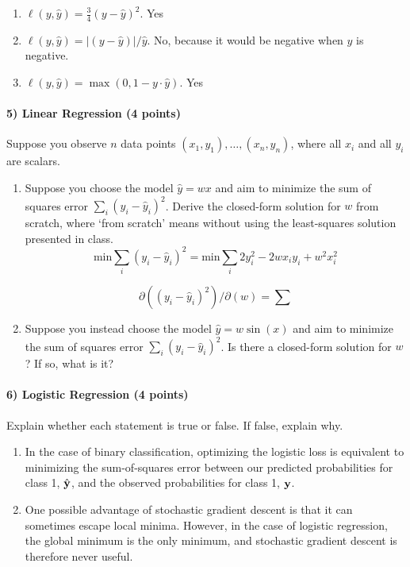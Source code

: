 \documentclass[11pt]{article}
\newcommand{\vy}{{\bf y}}
\begin{document}
	\begin{enumerate}
		\item $\ell (y, \hat{y}) = \frac{3}{4} (y-\hat{y})^2$. Yes
		\item $\ell (y, \hat{y}) = |(y-\hat{y})|/\hat{y}$. No, because it would be negative when $\hat{y}$ is negative.
		\item $\ell (y, \hat{y}) = \max(0, 1 - y \cdot \hat{y})$. Yes
	\end{enumerate}
	
	\paragraph{5) Linear Regression (4 points)} Suppose you observe $n$ data points $(x_1, y_1), \ldots, (x_n, y_n)$, where all $x_i$ and all $y_i$ are scalars.
	\begin{enumerate}
		\item Suppose you choose the model $\hat{y} = w x$ and aim to minimize the sum of squares error $\sum_i (y_i - \hat{y}_i)^2$. Derive the closed-form solution for $w$ from scratch, where `from scratch' means without using the least-squares solution presented in class.
		\begin{equation}
		\text{min} \sum_i (y_i - \hat{y}_i) ^2
		= \text{min} \sum_i 2 y_i^2 - 2 w x_i y_i + w^2 x_i^2
		\end{equation}
		
		\begin{equation}
		\partial{((y_i - \hat{y}_i) ^2)}/\partial(w) = \sum
		\end{equation}
		
		\item Suppose you instead choose the model $\hat{y} = w \sin(x)$ and aim to minimize the sum of squares error $\sum_i (y_i - \hat{y}_i)^2$. Is there a closed-form solution for $w$? If so, what is it?
	\end{enumerate}
	
	\paragraph{6) Logistic Regression (4 points)} Explain whether each statement is true or false. If false, explain why.
	\begin{enumerate}
		\item In the case of binary classification, optimizing the logistic loss is equivalent to minimizing the sum-of-squares error between our predicted probabilities for class 1, $\hat{\vy}$, and the observed probabilities for class 1, $\vy$.
		\item One possible advantage of stochastic gradient descent is that it can sometimes escape local minima. However, in the case of logistic regression, the global minimum is the only minimum, and stochastic gradient descent is therefore never useful.
	\end{enumerate}
	
\end{document}
